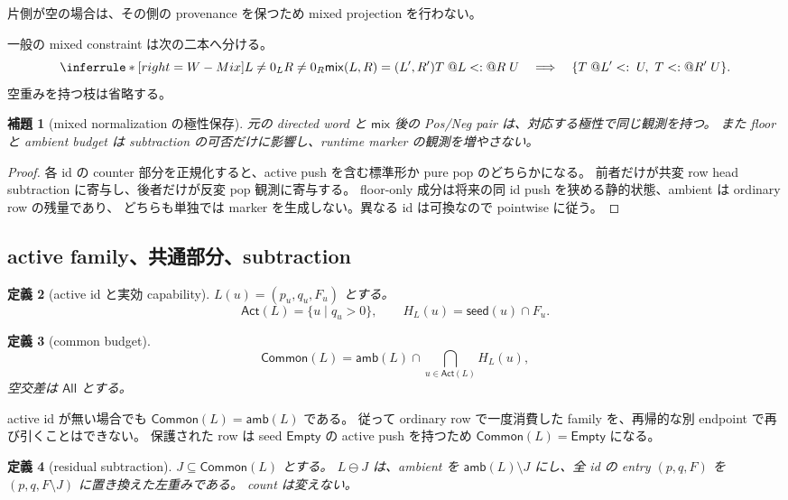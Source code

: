 \documentclass[uplatex,dvipdfmx,a4paper,10.5pt]{jsarticle}
\makeatletter
\theoremstyle{jpplain}
\newtheorem{definition}{定義}[section]
\newtheorem{lemma}[definition]{補題}
\newcommand{\All}{\mathsf{All}}
\newcommand{\Empty}{\mathsf{Empty}}
\newcommand{\Common}{\mathsf{Common}}
\newcommand{\mix}{\mathsf{mix}}
\newcommand{\wsub}[4]{#1\;@#2\mathrel{<:}@#3\;#4}
\newcommand{\lsub}[3]{#1\;@#2\mathrel{<:}\;#3}
\newcommand{\rsub}[3]{#1\mathrel{<:}@#2\;#3}
\newcommand{\amb}{\mathsf{amb}}
\newcommand{\seedcap}{\mathsf{seed}}
\makeatother
\begin{document}
片側が空の場合は、その側の provenance を保つため mixed projection を行わない。

\begin{formalbox}
一般の mixed constraint は次の二本へ分ける。
\[
\inferrule*[right=W-Mix]
 {L\neq0_L\\R\neq0_R\\\mix(L,R)=(L',R')}
 {\wsub{T}{L}{R}{U}\quad\Longrightarrow\quad
  \{\lsub{T}{L'}{U},\ \rsub{T}{R'}{U}\}.}
\]
空重みを持つ枝は省略する。
\end{formalbox}

\begin{lemma}[mixed normalization の極性保存]
元の directed word と $\mix$ 後の Pos/Neg pair は、対応する極性で同じ観測を持つ。
また floor と ambient budget は subtraction の可否だけに影響し、runtime marker の観測を増やさない。
\end{lemma}

\begin{proof}
各 id の counter 部分を正規化すると、active push を含む標準形か pure pop のどちらかになる。
前者だけが共変 row head subtraction に寄与し、後者だけが反変 pop 観測に寄与する。
floor-only 成分は将来の同 id push を狭める静的状態、ambient は ordinary row の残量であり、
どちらも単独では marker を生成しない。異なる id は可換なので pointwise に従う。
\end{proof}

\subsection{active family、共通部分、subtraction}

\begin{definition}[active id と実効 capability]
$L(u)=(p_u,q_u,F_u)$ とする。
\[
  \mathsf{Act}(L)=\{u\mid q_u>0\},
  \qquad
  H_L(u)=\seedcap(u)\cap F_u.
\]
\end{definition}

\begin{definition}[common budget]
\[
  \Common(L)
  =\amb(L)\cap
   \bigcap_{u\in\mathsf{Act}(L)}H_L(u),
\]
空交差は $\All$ とする。
\end{definition}

active id が無い場合でも $\Common(L)=\amb(L)$ である。
従って ordinary row で一度消費した family を、再帰的な別 endpoint で再び引くことはできない。
保護された row は seed $\Empty$ の active push を持つため $\Common(L)=\Empty$ になる。

\begin{definition}[residual subtraction]
$J\subseteq\Common(L)$ とする。
$L\ominus J$ は、ambient を $\amb(L)\setminus J$ にし、全 id の entry
$(p,q,F)$ を $(p,q,F\setminus J)$ に置き換えた左重みである。
count は変えない。
\end{definition}
\end{document}

